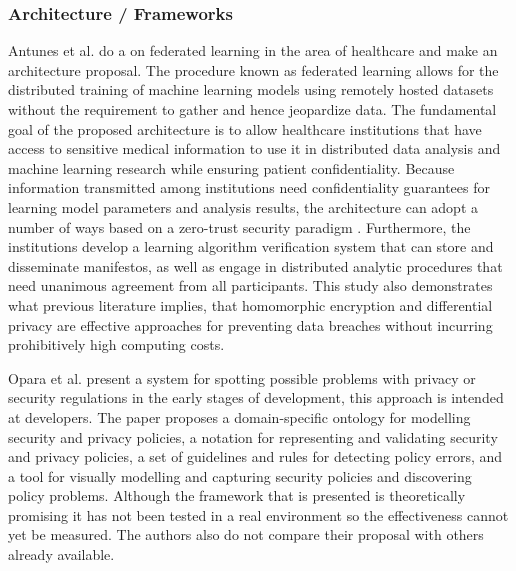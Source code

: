 \subsubsection{Architecture / Frameworks}\label{subsubsection:architecture_frameworks}

Antunes et al. \cite{AntunesFederated} do a \hyperlink{\acronym}{\acronym} on federated learning in
the area of healthcare and make an architecture proposal. The procedure
known as federated learning allows for the distributed training of machine
learning models using remotely hosted datasets without the requirement to
gather and hence jeopardize data. The fundamental goal of the proposed architecture is
to allow healthcare institutions that have access to sensitive medical information
to use it in distributed data analysis and machine learning research while
ensuring patient confidentiality. Because information transmitted among
institutions need confidentiality guarantees for learning model parameters
and analysis results, the architecture can adopt a number of ways based on
a zero-trust security paradigm \cite{ChenSecurity}. Furthermore, the institutions
develop a learning algorithm verification system that can store and disseminate
manifestos, as well as engage in distributed analytic procedures that need
unanimous agreement from all participants. This study also demonstrates
what previous literature implies, that homomorphic encryption and differential
privacy are effective approaches for preventing data breaches without incurring
prohibitively high computing costs.

Opara et al. \cite{opara2022framework} present a system for spotting possible
problems with privacy or security regulations in the early stages of development,
this approach is intended at developers. The paper proposes a domain-specific
ontology for modelling \hyperlink{\acronym}{\acronym} security and privacy policies, a notation for
representing and validating \hyperlink{\acronym}{\acronym} security and privacy policies, a set of
guidelines and rules for detecting \hyperlink{\acronym}{\acronym} policy errors, and a tool for visually
modelling and capturing \hyperlink{\acronym}{\acronym} security policies and discovering policy problems.
Although the framework that is presented is theoretically promising it has
not been tested in a real environment so the effectiveness cannot yet be
measured. The authors also do not compare their proposal with others already
available.

